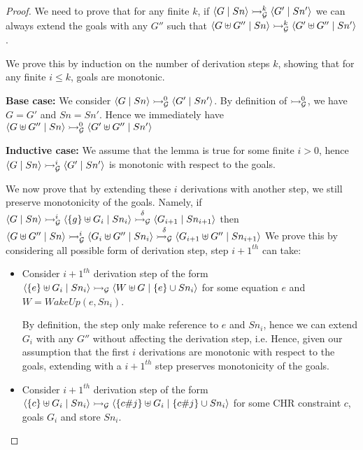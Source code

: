 \documentclass{tlp}
\begin{document}
\begin{proof}
  We need to prove that for any finite $k$, if $\langle G\mid Sn \rangle \rightarrowtail_{\cal G}^k \langle G'\mid Sn' \rangle$
  we can always extend the goals with any $G''$ such that 
  $\langle G \uplus G''\mid Sn \rangle \rightarrowtail_{\cal G}^k \langle G' \uplus G''\mid Sn' \rangle$.

  We prove this by induction on the number of derivation steps $k$, showing that for any finite
  $i \leq k$, goals are monotonic.
  
  {\bf Base case:} We consider $\langle G\mid Sn \rangle \rightarrowtail_{\cal G}^0 \langle G'\mid Sn' \rangle$. By
  definition of $\rightarrowtail_{\cal G}^0$, we have $G = G'$ and $Sn = Sn'$. Hence we immediately
  have $\langle G \uplus G''\mid Sn \rangle \rightarrowtail_{\cal G}^0 \langle G' \uplus G''\mid Sn' \rangle$
  
  {\bf Inductive case:} We assume that the lemma is true for some finite $i > 0$,
  hence $\langle G\mid Sn \rangle \rightarrowtail_{\cal G}^i \langle G'\mid Sn' \rangle$ is monotonic with respect
  to the goals.
  
  We now prove that by extending these $i$ derivations with another step, 
  we still preserve monotonicity of the goals. Namely, if
  $\langle G\mid Sn \rangle \rightarrowtail_{\cal G}^i \langle \{g\} \uplus G_i\mid Sn_i \rangle \stackrel{\delta}{\rightarrowtail_{\cal G}} \langle G_{i+1}\mid Sn_{i+1} \rangle$
  then $\langle G \uplus G''\mid Sn \rangle \rightarrowtail_{\cal G}^i \langle G_i \uplus G''\mid Sn_i \rangle 
  \stackrel{\delta}{\rightarrowtail_{\cal G}} \langle G_{i+1} \uplus G''\mid Sn_{i+1} \rangle$
  We prove this by considering all possible form of derivation step, step $i+1^{th}$ can take:
  \begin{itemize}
	  \item {} Consider $i+1^{th}$ derivation step of the form 
	        $\langle \{e\} \uplus G_i\mid Sn_i \rangle \rightarrowtail_{\cal G} \langle W \uplus G\mid\{e\} \cup Sn_i \rangle$
	        for some equation $e$ and $W = WakeUp(e,Sn_i)$.
	        
	        By definition, the  step only make reference to $e$ and $Sn_i$, hence we can
	        extend $G_i$ with any $G''$ without affecting the derivation step, i.e.
	           \goaltrans 
	        \eda
	        Hence, given our assumption that the first $i$ derivations are monotonic with respect
          to the goals,	extending with a $i+1^{th}$  step preserves monotonicity
          of the goals. 
	  \item {} Consider $i+1^{th}$ derivation step of the form 
	        $\langle \{c\} \uplus G_i\mid Sn_i \rangle \rightarrowtail_{\cal G} \langle \{c\#j\} \uplus G_i\mid\{c\#j\} \cup Sn_i \rangle$
	        for some CHR constraint $c$, goals $G_i$ and store $Sn_i$.
	        

\end{itemize}
\end{proof}
\end{document}
